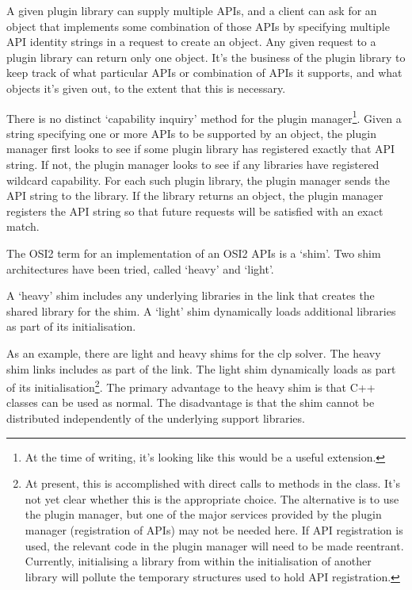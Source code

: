 \documentclass{article}
\newcommand{\OsiTwo}{OSI2\xspace}
\begin{document}
A given plugin library can supply multiple APIs, and a client can ask for an
object that implements some combination of those APIs by specifying multiple
API identity strings in a request to create an object.
Any given request to a plugin library can return only one object.
It's the business of the plugin library to keep track of what particular APIs
or combination of APIs it supports, and what objects it's given out, to the
extent that this is necessary.

There is no distinct `capability inquiry' method for the plugin
manager\footnote{%
    At the time of writing, it's looking like this would be a useful
    extension.}.
Given a string specifying one or more APIs to be supported by an object, the
plugin manager first looks to see if some plugin library has registered
exactly that API string.
If not, the plugin manager looks to see if any libraries have registered
wildcard capability.
For each such plugin library, the plugin manager sends the API string to the
library.
If the library returns an object, the plugin manager registers the API string
so that future requests will be satisfied with an exact match.


The \OsiTwo term for an implementation of an \OsiTwo APIs is a `shim'.
Two shim architectures have been tried, called `heavy' and `light'.

A `heavy' shim includes any underlying libraries in the link that creates the
shared library for the shim.
A `light' shim dynamically loads additional libraries as part of its
initialisation.

As an example, there are light and heavy shims for the clp solver.
The heavy shim links includes  as part of the link.
The light shim dynamically loads  as part of its
initialisation\footnote{%
    At present, this is accomplished with direct calls to methods in the
     class.
    It's not yet clear whether this is the appropriate choice.
    The alternative is to use the plugin manager, but one of the major
    services provided by
    the plugin manager (registration of APIs) may not be needed here.
    If API registration is used, the relevant code in the plugin manager
    will need to be made reentrant.
    Currently, initialising a library from within the initialisation of
    another library will pollute the temporary structures used to hold API
    registration.}.
The primary advantage to the heavy shim is that C++ classes can be used as
normal.
The disadvantage is that the shim cannot be distributed independently of the
underlying support libraries.
\end{document}

